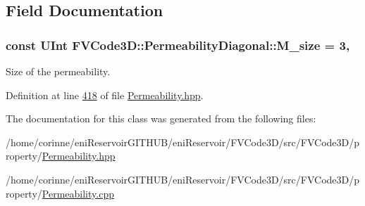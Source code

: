 \subsection{Field Documentation}
\subsubsection[{\texorpdfstring{M\+\_\+size}{M_size}}]{\setlength{\rightskip}{0pt plus 5cm}const {\bf U\+Int} F\+V\+Code3\+D\+::\+Permeability\+Diagonal\+::\+M\+\_\+size = 3\hspace{0.3cm}{\ttfamily [static]}, {\ttfamily [private]}}\hypertarget{classFVCode3D_1_1PermeabilityDiagonal_a24f8f212517aec83cf08bf236a6b7444}{}\label{classFVCode3D_1_1PermeabilityDiagonal_a24f8f212517aec83cf08bf236a6b7444}


Size of the permeability. 



Definition at line \hyperlink{Permeability_8hpp_source_l00418}{418} of file \hyperlink{Permeability_8hpp_source}{Permeability.\+hpp}.



The documentation for this class was generated from the following files\+:\begin{DoxyCompactItemize}
\item 
/home/corinne/eni\+Reservoir\+G\+I\+T\+H\+U\+B/eni\+Reservoir/\+F\+V\+Code3\+D/src/\+F\+V\+Code3\+D/property/\hyperlink{Permeability_8hpp}{Permeability.\+hpp}\item 
/home/corinne/eni\+Reservoir\+G\+I\+T\+H\+U\+B/eni\+Reservoir/\+F\+V\+Code3\+D/src/\+F\+V\+Code3\+D/property/\hyperlink{Permeability_8cpp}{Permeability.\+cpp}\end{DoxyCompactItemize}
